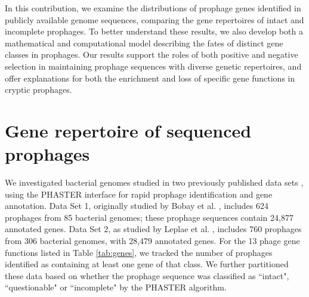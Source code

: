In this contribution, we examine the distributions of prophage genes identified in publicly available genome sequences, comparing the gene repertoires of intact and incomplete prophages.  To better understand these results, we also develop both a mathematical and computational model describing the fates of distinct gene classes in prophages. 
Our results support the roles of both positive and negative selection in maintaining prophage sequences with diverse genetic repertoires, and offer explanations for both the enrichment and loss of specific gene functions in cryptic prophages.

\section{Gene repertoire of sequenced prophages}
We investigated bacterial genomes studied in two previously published data sets \cite{bobay_pervasive_2014,leplae_aclame:_2010}, using the PHASTER interface \cite{arndt_phaster:_2016} for rapid prophage identification and gene annotation.  Data Set 1, originally studied by Bobay et al. \cite{bobay_pervasive_2014}, includes 624 prophages from 85 bacterial genomes; these prophage sequences contain 24,877 annotated genes.  Data Set 2, as studied by Leplae et al. \cite{leplae_aclame:_2010}, includes 760 prophages  from 306 bacterial genomes, with 28,479 annotated genes.  For the 13 phage gene functions listed in Table \ref{tab:genes}, we tracked the number of prophages identified as containing at least one gene of that class.  We further partitioned these data based on whether the prophage sequence was classified as ``intact", ``questionable" or ``incomplete" by the PHASTER algorithm.

